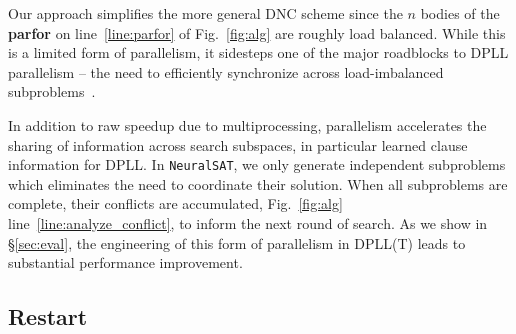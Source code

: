 \documentclass[oneside,11pt,dvipsnames]{book}
\numberwithin{equation}{section}
\theoremstyle{definition}
\theoremstyle{remark}
\newcommand{\tool}{\texttt{NeuralSAT}}
\begin{document}
Our approach simplifies the more general DNC scheme since the $n$ bodies of the \textbf{parfor} on line~\ref{line:parfor} of Fig.~\ref{fig:alg} are roughly load balanced.
While this is a limited form of parallelism, it sidesteps one of the major roadblocks to DPLL parallelism -- the need to efficiently synchronize across load-imbalanced subproblems~\cite{le2017painless,le2019modular}.

In addition to raw speedup due to multiprocessing, parallelism accelerates the sharing of information across search subspaces, in particular learned clause information for DPLL. In \tool{}, we only generate independent subproblems which eliminates the need to coordinate their solution. When all subproblems are complete, their conflicts are accumulated, Fig.~\ref{fig:alg} line~\ref{line:analyze_conflict},  to inform the next round of search.
As we show in \S\ref{sec:eval}, the engineering of this form of parallelism in DPLL(T) leads to substantial performance improvement.

\subsection{Restart}









\end{document}
